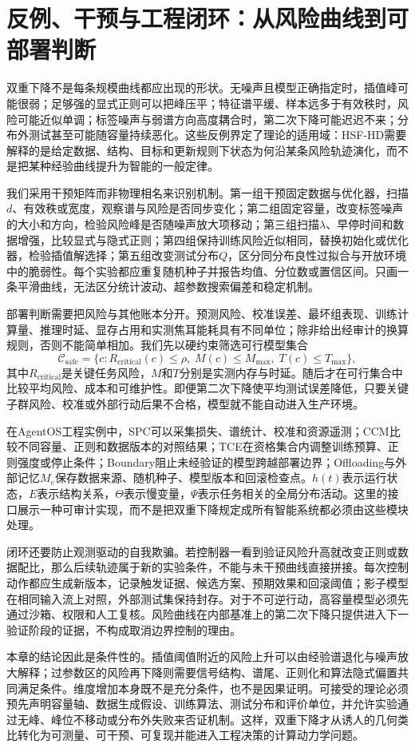 \section{反例、干预与工程闭环：从风险曲线到可部署判断}
\label{sec:section_9546}

双重下降不是每条规模曲线都应出现的形状。无噪声且模型正确指定时，插值峰可能很弱；足够强的显式正则可以把峰压平；特征谱平缓、样本远多于有效秩时，风险可能近似单调；标签噪声与弱谱方向高度耦合时，第二次下降可能迟迟不来；分布外测试甚至可能随容量持续恶化。这些反例界定了理论的适用域：HSF-HD需要解释的是给定数据、结构、目标和更新规则下状态为何沿某条风险轨迹演化，而不是把某种经验曲线提升为智能的一般定律。

我们采用干预矩阵而非物理相名来识别机制。第一组干预固定数据与优化器，扫描$d$、有效秩或宽度，观察谱与风险是否同步变化；第二组固定容量，改变标签噪声的大小和方向，检验风险峰是否随噪声放大项移动；第三组扫描$\lambda$、早停时间和数据增强，比较显式与隐式正则；第四组保持训练风险近似相同，替换初始化或优化器，检验插值解选择；第五组改变测试分布$Q$，区分同分布良性过拟合与开放环境中的脆弱性。每个实验都应重复随机种子并报告均值、分位数或置信区间。只画一条平滑曲线，无法区分统计波动、超参数搜索偏差和稳定机制。

部署判断需要把风险与其他账本分开。预测风险、校准误差、最坏组表现、训练计算量、推理时延、显存占用和实测焦耳能耗具有不同单位；除非给出经审计的换算规则，否则不能简单相加。我们先以硬约束筛选可行模型集合
\begin{equation}
  \mathcal{C}_{\mathrm{safe}}
  =\{c:R_{\mathrm{critical}}(c)\leq \rho,
  \;M(c)\leq M_{\max},\;T(c)\leq T_{\max}\},
\end{equation}
其中$R_{\mathrm{critical}}$是关键任务风险，$M$和$T$分别是实测内存与时延。随后才在可行集合中比较平均风险、成本和可维护性。即便第二次下降使平均测试误差降低，只要关键子群风险、校准或外部行动后果不合格，模型就不能自动进入生产环境。

在AgentOS工程实例中，SPC可以采集损失、谱统计、校准和资源遥测；CCM比较不同容量、正则和数据版本的对照结果；TCE在资格集合内调整训练预算、正则强度或停止条件；Boundary阻止未经验证的模型跨越部署边界；Offloading与外部记忆$M_e$保存数据来源、随机种子、模型版本和回滚检查点。$h(t)$表示运行状态，$E$表示结构关系，$\Theta$表示慢变量，$\Psi$表示任务相关的全局分布活动。这里的接口展示一种可审计实现，而不是把双重下降规定成所有智能系统都必须由这些模块处理。

闭环还要防止观测驱动的自我欺骗。若控制器一看到验证风险升高就改变正则或数据配比，那么后续轨迹属于新的实验条件，不能与未干预曲线直接拼接。每次控制动作都应生成新版本，记录触发证据、候选方案、预期效果和回滚阈值；影子模型在相同输入流上对照，外部测试集保持封存。对于不可逆行动，高容量模型必须先通过沙箱、权限和人工复核。风险曲线在内部基准上的第二次下降只提供进入下一验证阶段的证据，不构成取消边界控制的理由。

本章的结论因此是条件性的。插值阈值附近的风险上升可以由经验谱退化与噪声放大解释；过参数区的风险再下降则需要信号结构、谱尾、正则化和算法隐式偏置共同满足条件。维度增加本身既不是充分条件，也不是因果证明。可接受的理论必须预先声明容量轴、数据生成假设、训练算法、测试分布和评价单位，并允许实验通过无峰、峰位不移动或分布外失败来否证机制。这样，双重下降才从诱人的几何类比转化为可测量、可干预、可复现并能进入工程决策的计算动力学问题。

